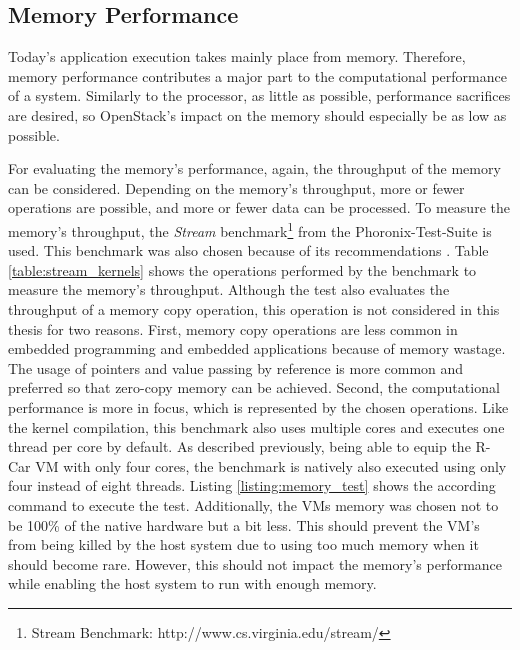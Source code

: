         \subsection{Memory Performance}
        \label{subsection:methodology_memory}
        
            Today's application execution takes mainly place from memory.
            Therefore, memory performance contributes a major part to the computational performance of a system.
            Similarly to the processor, as little as possible, performance sacrifices are desired, so OpenStack's impact on the memory should especially be as low as possible.
            
            \noindent For evaluating the memory's performance, again, the throughput of the memory can be considered.
            Depending on the memory's throughput, more or fewer operations are possible, and more or fewer data can be processed.
            To measure the memory's throughput, the \textsl{Stream} benchmark\footnote{Stream Benchmark: http://www.cs.virginia.edu/stream/} \cite{McCalpin1995} from the Phoronix-Test-Suite is used.
            This benchmark was also chosen because of its recommendations \cite{OpenStackHTG2016}.
            Table \ref{table:stream_kernels} shows the operations performed by the benchmark to measure the memory's throughput.
            Although the test also evaluates the throughput of a memory copy operation, this operation is not considered in this thesis for two reasons.
            First, memory copy operations are less common in embedded programming and embedded applications because of memory wastage.
            The usage of pointers and value passing by reference is more common and preferred so that zero-copy memory can be achieved.
            Second, the computational performance is more in focus, which is represented by the chosen operations.
            Like the kernel compilation, this benchmark also uses multiple cores and executes one thread per core by default.
            As described previously, being able to equip the R-Car \ac{VM} with only four cores, the benchmark is natively also executed using only four instead of eight threads.
            Listing \ref{listing:memory_test} shows the according command to execute the test.
            Additionally, the \acp{VM} memory was chosen not to be 100\% of the native hardware but a bit less.
            This should prevent the \ac{VM}'s from being killed by the host system due to using too much memory when it should become rare.
            However, this should not impact the memory’s performance while enabling the host system to run with enough memory. 
            
